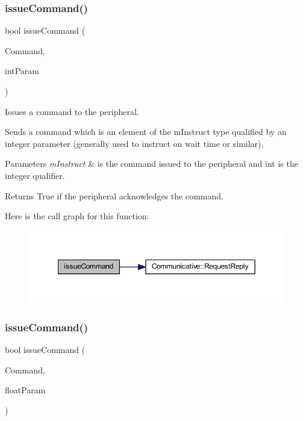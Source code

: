 \subsubsection{\texorpdfstring{issueCommand()}{issueCommand()}\hspace{0.1cm}{\footnotesize\ttfamily [2/4]}}
{\footnotesize\ttfamily bool issue\+Command (\begin{DoxyParamCaption}\item[{\mbox{\hyperlink{_s_p_i___instruction_set_8h_afefab269eb3692ecb3e5fcdbb9440792}{m\+Instruct}}}]{Command,  }\item[{int}]{int\+Param }\end{DoxyParamCaption})}



Issues a command to the peripheral. 

Sends a command which is an element of the m\+Instruct type qualified by an integer parameter (generally used to instruct on wait time or similar). 
\begin{DoxyParams}{Parameters}
{\em m\+Instruct} & is the command issued to the peripheral and int is the integer qualifier. \\
\hline
\end{DoxyParams}
\begin{DoxyReturn}{Returns}
True if the peripheral acknowledges the command. 
\end{DoxyReturn}
Here is the call graph for this function\+:
\nopagebreak
\begin{figure}[H]
\begin{center}
\leavevmode
\includegraphics[width=349pt]{class_instructable_ae1de225deda4decc52ce8e06efa8c547_cgraph}
\end{center}
\end{figure}
\mbox{\label{class_instructable_a556e6313ec5ac21a30efe8a5ef28a486}} 
\subsubsection{\texorpdfstring{issueCommand()}{issueCommand()}\hspace{0.1cm}{\footnotesize\ttfamily [3/4]}}
{\footnotesize\ttfamily bool issue\+Command (\begin{DoxyParamCaption}\item[{\mbox{\hyperlink{_s_p_i___instruction_set_8h_afefab269eb3692ecb3e5fcdbb9440792}{m\+Instruct}}}]{Command,  }\item[{float}]{float\+Param }\end{DoxyParamCaption})}



